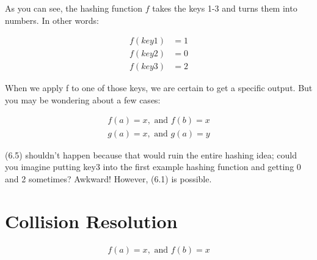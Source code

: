 \documentclass[11pt]{book}
\begin{document}
		\begin{center}
		\end{center}

		\noindent As you can see, the hashing function $f$ takes the keys 1-3 and turns
		them into numbers. In other words:

		\begin{align*}
			f(key1) &= 1 \\
			f(key2) &= 0 \\
			f(key3) &= 2
		\end{align*}

		\noindent When we apply f to one of those keys, we are certain to get a specific
		output. But you may be wondering about a few cases:

		\begin{align*}
			f(a) = x, \text{ and } f(b) = x \\
			g(a) = x, \text{ and } g(a) = y
		\end{align*}

		\noindent (6.5) shouldn't happen because that would ruin the entire hashing idea;
		could you imagine putting key3 into the first example hashing function and getting
		0 and 2 sometimes? Awkward! However, (6.1) is possible.

	\section{Collision Resolution}
		\begin{align*}
			f(a) = x, \text{ and } f(b) = x
		\end{align*}
\end{document}
